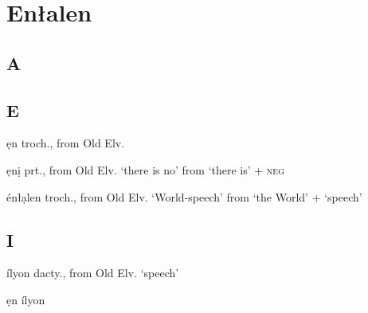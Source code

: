 \chapter{En\l alen}

\begin{multicols*}{2}

\section{A}

\section{E}

\begin{entrylist}
    \begin{dictentry}{ẹn}{
        troch., from Old Elv. 
    }\label{enl:en_L}
    \end{dictentry}
    \begin{dictentry}{ẹnị}{
        prt., from Old Elv.  `there is no' from  `there is' +  \textsc{neg}
    }\label{enl:eni_LL}
    \end{dictentry}
    \begin{dictentry}{énłạlen}{
        troch., from Old Elv.  `World-speech' from  `the World' +  `speech'
        }
        \label{enl:enLalen_HLM}
    \end{dictentry}
\end{entrylist}

\section{I}

\begin{entrylist}
    \begin{dictentry}{ílyon}{
        dacty., from Old Elv.  `speech'
    }\label{enl:ilyon_HM}
        \begin{entrysublist}
            \begin{dictentry}{ẹn ílyon}{}\label{enl:en_L_ilyon_HM}
            \end{dictentry}
        \end{entrysublist}
    \end{dictentry}
\end{entrylist}


\end{multicols*}
